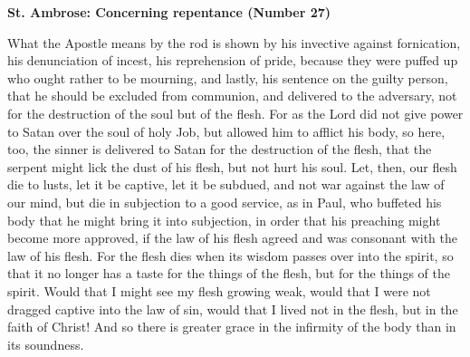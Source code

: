 \textbf{St. Ambrose: Concerning repentance (Number 27)}


What the Apostle means by the rod is shown by his invective against fornication, his denunciation of incest, his reprehension of pride, because they were puffed up who ought rather to be mourning, and lastly, his sentence on the guilty person, that he should be excluded from communion, and delivered to the adversary, not for the destruction of the soul but of the flesh. For as the Lord did not give power to Satan over the soul of holy Job, but allowed him to afflict his body, so here, too, the sinner is delivered to Satan for the destruction of the flesh, that the serpent might lick the dust of his flesh, but not hurt his soul. Let, then, our flesh die to lusts, let it be captive, let it be subdued, and not war against the law of our mind, but die in subjection to a good service, as in Paul, who buffeted his body that he might bring it into subjection, in order that his preaching might become more approved, if the law of his flesh agreed and was consonant with the law of his flesh. For the flesh dies when its wisdom passes over into the spirit, so that it no longer has a taste for the things of the flesh, but for the things of the spirit. Would that I might see my flesh growing weak, would that I were not dragged captive into the law of sin, would that I lived not in the flesh, but in the faith of Christ! And so there is greater grace in the infirmity of the body than in its soundness.




